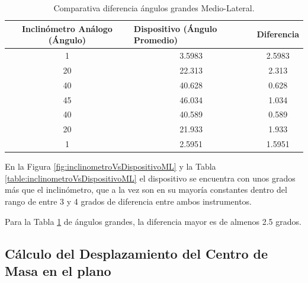 \documentclass[12pt,a4paper]{article}
\begin{document}
\begin{table}[H]
	\centering
	\begin{tabular}{|c|c|c|}
		\hline
		\textbf{Inclinómetro Análogo (Ángulo)} & \multicolumn{1}{l|}{\textbf{Dispositivo (Ángulo Promedio)}} & Diferencia				 \\ \hline
		1                                      & 3.5983                                                      & 2.5983                     \\ \hline
		20                                     & 22.313                                                      & 2.313                     \\ \hline
		40                                     & 40.628                                                      & 0.628                    \\ \hline
		45                                     & 46.034                                                      & 1.034                      \\ \hline
		40                                     & 40.589                                                      & 0.589                     \\ \hline
		20                                     & 21.933                                                      & 1.933                      \\ \hline
		1                                      & 2.5951                                                      & 1.5951                    \\ \hline
	\end{tabular}
	\caption{Comparativa diferencia ángulos grandes Medio-Lateral.}
	\label{table:inclinometroVsDispositivoMLD}
\end{table}

En la Figura \ref{fig:inclinometroVsDispositivoML} y la Tabla \ref{table:inclinometroVsDispositivoML} el dispositivo se encuentra con unos grados más que el inclinómetro, que a la vez son en su mayoría constantes dentro del rango de entre 3 y 4 grados de diferencia entre ambos instrumentos.

Para la Tabla \ref{table:inclinometroVsDispositivoMLD} de ángulos grandes, la diferencia mayor es de almenos 2.5 grados.
 
\newpage
\subsection{Cálculo del Desplazamiento del Centro de Masa en el plano}
\end{document}
